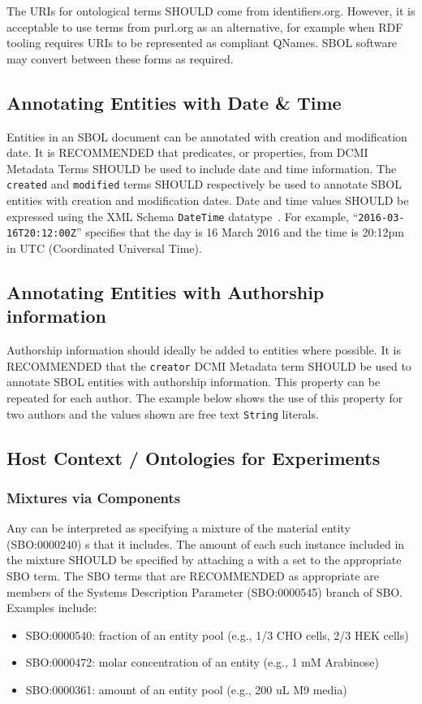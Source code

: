 The URIs for ontological terms SHOULD come from identifiers.org.  However, it is acceptable to use terms from purl.org as an alternative, for example when RDF tooling requires URIs to be represented as compliant QNames.  SBOL software may convert between these forms as required.

\subsection{Annotating Entities with Date \& Time}\label{sec:DateTime}
Entities in an SBOL document can be annotated with creation and modification date. It is RECOMMENDED that predicates, or properties, from DCMI Metadata Terms SHOULD be used to include date and time information. The \texttt{created} and \texttt{modified} terms SHOULD respectively be used to annotate SBOL entities with creation and modification dates. Date and time values SHOULD be expressed using the XML Schema \texttt{DateTime} datatype~\citep{Biron2004}. For example, ``\texttt{2016-03-16T20:12:00Z}'' specifies that the day is 16 March 2016 and the time is 20:12pm in UTC (Coordinated Universal Time).

\subsection{Annotating Entities with Authorship information}\label{sec:Authorship}
Authorship information should ideally be added to  entities where possible. It is RECOMMENDED that the \texttt{creator} DCMI Metadata term SHOULD be used to annotate SBOL entities with authorship information. This property can be repeated for each author. The example below shows the use of this property for two authors and the values shown are free text \texttt{String} literals.

\subsection{Host Context / Ontologies for Experiments}

\subsubsection{Mixtures via Components}

Any  can be interpreted as specifying a mixture of the material entity (SBO:0000240) s that it includes.  The amount of each such instance included in the mixture SHOULD be specified by attaching a  with a  set to the appropriate SBO term. The SBO terms that are RECOMMENDED as appropriate are members of the Systems Description Parameter (SBO:0000545) branch of SBO. Examples include:
\begin{itemize}
\item SBO:0000540: fraction of an entity pool (e.g., 1/3 CHO cells, 2/3 HEK cells)
\item SBO:0000472: molar concentration of an entity (e.g., 1 mM Arabinose)
\item SBO:0000361: amount of an entity pool (e.g., 200 uL M9 media)
\end{itemize}


